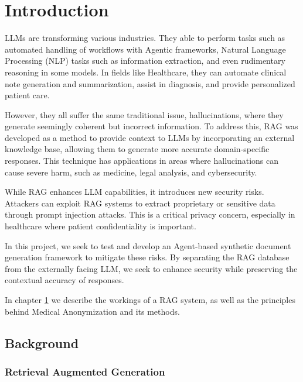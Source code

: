 \chapter{Introduction} \label{introduction}
LLMs are transforming various industries. They able to perform tasks such as automated handling of workflows with Agentic frameworks, Natural Language Processing (NLP) tasks such as information extraction, and even rudimentary reasoning in some models. In fields like Healthcare, they can automate clinical note generation and summarization, assist in diagnosis, and provide personalized patient care.

However, they all suffer the same traditional issue, hallucinations, where they generate seemingly coherent but incorrect information. To address this, RAG was developed as a method to provide context to LLMs by incorporating an external knowledge base, allowing them to generate more accurate domain-specific responses. This technique has applications in areas where hallucinations can cause severe harm, such as medicine, legal analysis, and cybersecurity.

While RAG enhances LLM capabilities, it introduces new security risks. Attackers can exploit RAG systems to extract proprietary or sensitive data through prompt injection attacks. This is a critical privacy concern, especially in healthcare where patient confidentiality is important.

In this project, we seek to test and develop an Agent-based synthetic document generation framework to mitigate these risks. By separating the RAG database from the externally facing LLM, we seek to enhance security while preserving the contextual accuracy of responses.

In chapter \ref{introduction} we describe the workings of a RAG system, as well as the principles behind Medical Anonymization and its methods.

\section{Background}

\subsection{Retrieval Augmented Generation}

